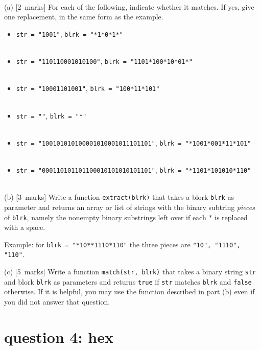 \documentclass[12pt]{article}
\newcommand{\mymarks}[1]{\mbox{\small [#1 marks]}}
\begin{document}
~

(a) \mymarks{2}
For each of the following, indicate whether it matches. 
If yes, give one replacement, in the same form as the example.

\begin{itemize}
\item \verb&str = "1001"&, \verb&blrk = "*1*0*1*"& \\~\\
\item \verb&str = "110110001010100"&, \verb&blrk = "1101*100*10*01*"& \\~\\
\item \verb&str = "10001101001"&, \verb&blrk = "100*11*101"& \\~\\
\item \verb&str = ""&, \verb&blrk = "*"& \\~\\
\item \verb&str = "100101010100001010001011101101"&, \verb&blrk = "*1001*001*11*101"& \\~\\
\item \verb&str = "000110101101100010101010101101"&, \verb&blrk = "*1101*101010*110"& \\~\\
\end{itemize}

\newpage
(b) \mymarks{3}
Write a function \verb&extract(blrk)& that takes a blork \texttt{blrk} 
as parameter and returns an array or list of strings 
with the binary subtring {\em pieces}
of \texttt{blrk}, namely the
nonempty binary substrings left over
if each $*$ is replaced with a space.

Example: for \texttt{blrk = "*10**1110*110"} the three 
pieces are \verb&"10", "1110", "110"&.

\vfill

(c) \mymarks{5}
Write a function \verb&match(str, blrk)& that takes a binary string \verb&str& and blork \verb&blrk& as parameters and returns \verb&true& if \verb&str& matches \verb&blrk& and \verb&false& otherwise. If it is helpful, you may use the function described in part (b) even if you did not 
answer that question.

\vfill


\newpage
\section*{question 4: hex}
\end{document}
